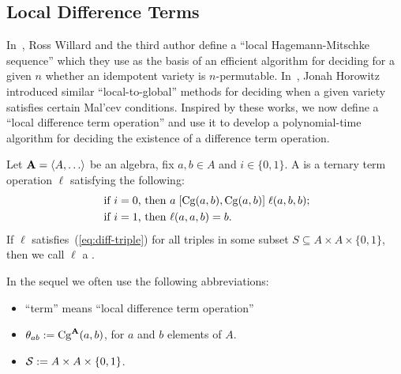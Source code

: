 \subsection{Local Difference Terms}
\label{sec:local-diff-terms}
In~\cite{MR3239624},
Ross Willard and the third author define %
a ``local Hagemann-Mitschke sequence'' which they use as the basis of
an efficient algorithm for deciding for a given $n$ whether an idempotent
variety is $n$-permutable.
In~\cite{MR3109457}, Jonah Horowitz introduced similar 
``local-to-global'' methods for deciding when a given variety satisfies 
certain Mal'cev conditions.
Inspired by these works, we now define a ``local difference term 
operation'' and use it to develop a polynomial-time algorithm for deciding
the existence of a difference term operation.

Let $\alg A =\< A, \dots\>$ be an algebra, fix $a, b \in A$ and
$i \in \{0,1\}$.
A  
is a ternary term operation $\ell$ satisfying the following:
\begin{align}
\text{ if $i=0$, then } & a \mathrel{[\operatorname{Cg}(a,b), \operatorname{Cg}(a,b)]} \ell(a,b,b); \label{eq:diff-triple}\\
\text{ if $i=1$, then } &\ell(a,a,b) = b. \nonumber
\end{align}
If $\ell$ satisfies~(\ref{eq:diff-triple}) for all triples
in some subset $S\subseteq A \times A \times \{0,1\}$, then we call $\ell$
a .

\smallskip

 In the sequel we often use the following 
abbreviations:
\begin{itemize}
\item 
``\ld term'' means ``local difference term operation''
\item $\theta_{ab}:= \operatorname{Cg}^{\mathbf{A}}(a, b)$,
for $a$ and $b$ elements of $A$.
\item $\mathcal{S} := A \times A \times \{0,1\}$. 
\end{itemize}

